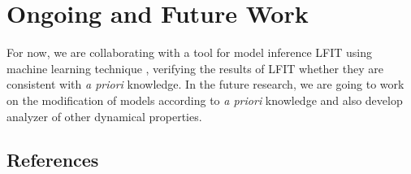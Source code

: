 \documentclass[final]{beamer}
\begin{document}
\begin{frame}[t]{}
\begin{columns}[t]
\begin{column}{.50\linewidth}
\section{Ongoing and Future Work}
For now, we are collaborating with a tool for model inference LFIT using machine learning technique \cite{inoue2014learning}, verifying the results of LFIT whether they are consistent with \textit{a priori} knowledge.
In the future research, we are going to work on the modification of models according to \textit{a priori} knowledge and 
also develop analyzer of other dynamical properties.

\subsection{References}



\end{column}
\end{columns}


\end{frame}
\end{document}
